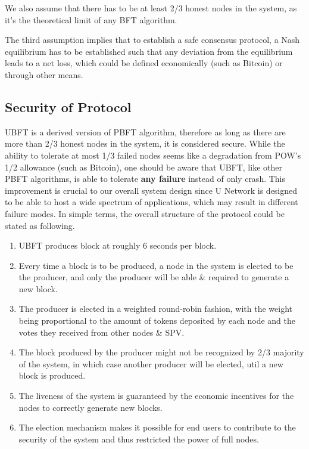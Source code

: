     We also assume that there has to be at least 2/3 honest nodes in the system, as it's the theoretical limit of any BFT algorithm.

    The third assumption implies that to establish a safe consensus protocol, a Nash equilibrium has to be established such that any deviation from the equilibrium leads to a net loss, which could be defined economically (such as Bitcoin) or through other means.

\subsection{Security of Protocol}
    UBFT is a derived version of PBFT algorithm, therefore as long as there are more than 2/3 honest nodes in the system, it is considered secure. While the ability to tolerate at most 1/3 failed nodes seems like a degradation from POW's 1/2 allowance (such as Bitcoin), one should be aware that UBFT, like other PBFT algorithms, is able to tolerate \textbf{any failure} instead of only crash. This improvement is crucial to our overall system design since U Network is designed to be able to host a wide spectrum of applications, which may result in different failure modes.
    In simple terms, the overall structure of the protocol could be stated as following.
\begin{enumerate}
    \item  UBFT produces block at roughly 6 seconds per block.
    \item  Every time a block is to be produced, a node in the system is elected to be the producer, and only the producer will be able \& required to generate a new block.
    \item  The producer is elected in a weighted round-robin fashion, with the weight being proportional to the amount of tokens deposited by each node and the votes they received from other nodes \& SPV.
    \item  The block produced by the producer might not be recognized by 2/3 majority of the system, in which case another producer will be elected, util a new block is produced.
    \item  The liveness of the system is guaranteed by the economic incentives for the nodes to correctly generate new blocks.
    \item  The election mechanism makes it possible for end users to contribute to the security of the system and thus restricted the power of full nodes.
\end{enumerate}

